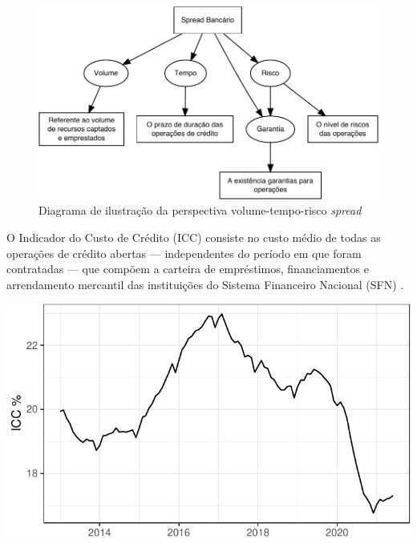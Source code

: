 \documentclass[
  12pt,
  12pt,
  openright,
  oneside,
  a4paper,
  chapter=TITLE,
  section=TITLE,
  subsection=TITLE,
  subsubsection=TITLE,
  english,
  portugues,
  sumario=tradicional]{abntex2}
\begin{document}
\begin{figure}[!htbp]
\vspace{20pt}
\caption{Diagrama de ilustração da perspectiva volume-tempo-risco  \emph{spread}}
\vspace{-4mm}

\begin{center}\includegraphics{12-exportedfigures/diagram.spread.vol.tem,ris-1} \end{center}
\vspace{-3mm}
\label{fig:diagramd}
\vspace{-2mm}
\end{figure}

O Indicador do Custo de Crédito (ICC) consiste no custo médio de todas as operações de crédito abertas --- independentes do período em que foram contratadas --- que compõem a carteira de empréstimos, financiamentos e arrendamento mercantil das instituições do Sistema Financeiro Nacional (SFN) \cite{BCB:2000}.

\begin{grafico}[!htbp]
\vspace{20pt}
\caption{Evolução do Indicador de Custo de Crédito (ICC)}
\vspace{-4mm}

\begin{center}\includegraphics{12-exportedfigures/ICC-1} \end{center}
\vspace{-3mm}
\label{graf:evicc}
\vspace{-2mm}
\end{grafico}
\end{document}
